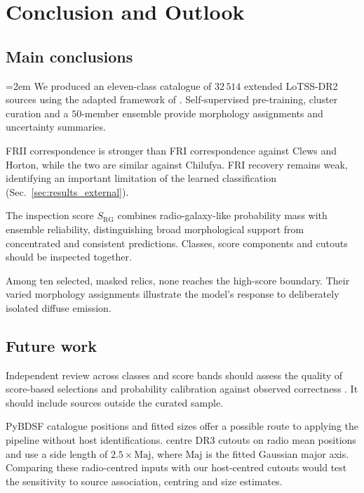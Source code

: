 \section{Conclusion and Outlook}
\label{sec:conclusion}

\subsection{Main conclusions}

\begingroup
\emergencystretch=2em
We produced an eleven-class catalogue of \(32\,514\) extended LoTSS-DR2 sources using the adapted framework of \citet{Nicolas2025}. Self-supervised pre-training, cluster curation and a \(50\)-member ensemble provide morphology assignments and uncertainty summaries.
\par
\endgroup

FRII correspondence is stronger than FRI correspondence against Clews and Horton, while the two are similar against Chilufya. FRI recovery remains weak, identifying an important limitation of the learned classification (Sec.~\ref{sec:results_external}).

The inspection score \(S_\mathrm{RG}\) combines radio-galaxy-like probability mass with ensemble reliability, distinguishing broad morphological support from concentrated and consistent predictions. Classes, score components and cutouts should be inspected together.

Among ten selected, masked relics, none reaches the high-score boundary.
Their varied morphology assignments illustrate the model's response to deliberately isolated diffuse emission.

\subsection{Future work}

Independent review across classes and score bands should assess the quality of score-based selections and probability calibration against observed correctness \citep{Guo2017}. It should include sources outside the curated sample.

PyBDSF catalogue positions and fitted sizes offer a possible route to applying the pipeline without host identifications. \citet[Sec.~2]{Nicolas2026} centre DR3 cutouts on radio mean positions and use a side length of \(2.5\times\mathrm{Maj}\), where \(\mathrm{Maj}\) is the fitted Gaussian major axis. 
Comparing these radio-centred inputs with our host-centred cutouts would test the sensitivity to source association, centring and size estimates.

